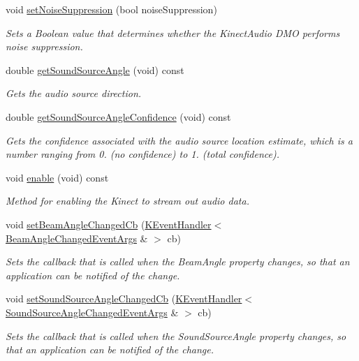 \begin{DoxyCompactItemize}
void \hyperlink{class_kinect_audio_source_aef4feea10e7367d61b157d742ae9686d}{set\-Noise\-Suppression} (bool noise\-Suppression)
\begin{DoxyCompactList}\small\item\em \-Sets a \-Boolean value that determines whether the \-Kinect\-Audio \-D\-M\-O performs noise suppression. \end{DoxyCompactList}\item 
double \hyperlink{class_kinect_audio_source_a8eb8b644c9ab0dc68e8a76a3cfe2bf90}{get\-Sound\-Source\-Angle} (void) const 
\begin{DoxyCompactList}\small\item\em \-Gets the audio source direction. \end{DoxyCompactList}\item 
double \hyperlink{class_kinect_audio_source_ad5c25cfddb99a9e54ae5a5753d83c6af}{get\-Sound\-Source\-Angle\-Confidence} (void) const 
\begin{DoxyCompactList}\small\item\em \-Gets the confidence associated with the audio source location estimate, which is a number ranging from 0. (no confidence) to 1. (total confidence). \end{DoxyCompactList}\item 
\hypertarget{class_kinect_audio_source_a7668d9dc9cc1fae7c083f26a2d1b3a6c}{void \hyperlink{class_kinect_audio_source_a7668d9dc9cc1fae7c083f26a2d1b3a6c}{enable} (void) const }\label{class_kinect_audio_source_a7668d9dc9cc1fae7c083f26a2d1b3a6c}

\begin{DoxyCompactList}\small\item\em \-Method for enabling the \-Kinect to stream out audio data. \end{DoxyCompactList}\item 
void \hyperlink{class_kinect_audio_source_afa2b83811e3d44a8fbc716a7af31dc4c}{set\-Beam\-Angle\-Changed\-Cb} (\hyperlink{class_k_event_handler}{\-K\-Event\-Handler}$<$ \hyperlink{class_beam_angle_changed_event_args}{\-Beam\-Angle\-Changed\-Event\-Args} \& $>$ cb)
\begin{DoxyCompactList}\small\item\em \-Sets the callback that is called when the \-Beam\-Angle property changes, so that an application can be notified of the change. \end{DoxyCompactList}\item 
void \hyperlink{class_kinect_audio_source_a965ce473c2dc52df022f4ca009593def}{set\-Sound\-Source\-Angle\-Changed\-Cb} (\hyperlink{class_k_event_handler}{\-K\-Event\-Handler}$<$ \hyperlink{class_sound_source_angle_changed_event_args}{\-Sound\-Source\-Angle\-Changed\-Event\-Args} \& $>$ cb)
\begin{DoxyCompactList}\small\item\em \-Sets the callback that is called when the \-Sound\-Source\-Angle property changes, so that an application can be notified of the change. \end{DoxyCompactList}\end{DoxyCompactItemize}


